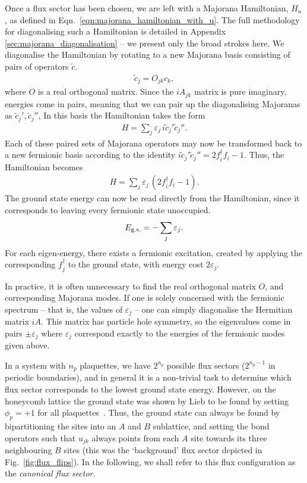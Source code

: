 Once a flux sector has been chosen, we are left with a Majorana Hamiltonian, $H_u$, as defined in Eqn.~\ref{eqn:majorana_hamiltonian_with_u}. The full methodology for diagonalising such a Hamiltonian is detailed in Appendix \ref{sec:majorana_diagonalisation} -- we present only the broad strokes here. We diagonalise the Hamiltonian by rotating to a new Majorana basis consisting of pairs of operators $\tilde c$. 
\begin{align}
    \tilde c_j = O_{jk}c_k,
\end{align}
where $O$ is a real orthogonal matrix. Since the $iA_{jk}$ matrix is pure imaginary, energies come in pairs, meaning that we can pair up the diagonalising Majoranas as $\tilde c_j', \tilde c_j''$,  In this basis the Hamiltonian takes the form 
\begin{align}
    H = \sum_{ j } \varepsilon_j\, i \tilde c_j' \tilde c_j''.
\end{align}
Each of these paired sets of Majorana operators may now be transformed back to a new fermionic basis according to the identity $ i \tilde c_j' \tilde c_j'' = 2 f_i^\dag f_i - 1$. Thus, the Hamiltonian becomes
\begin{align}
    H = \sum_{ j } \varepsilon_j\,(2 f_i^\dag f_i - 1).
\end{align}
The ground state energy can now be read directly from the Hamiltonian, since it corresponds to leaving every fermionic state unoccupied. 
\begin{align}
    E_\textup{g.s.} = -\sum_j \varepsilon_j.
\end{align}
For each eigen-energy, there exists a fermionic excitation, created by applying the corresponding $f^\dag_j$ to the ground state, with energy cost $2\varepsilon_j$. 

In practice, it is often unnecessary to find the real orthogonal matrix $O$, and corresponding Majorana modes. If one is solely concerned with the fermionic spectrum -- that is, the values of $\varepsilon_j$ -- one can simply diagonalise the Hermitian matrix $iA$. This matrix has particle hole symmetry, so the eigenvalues come in pairs $\pm \varepsilon_j$ where $\varepsilon_j$ correspond exactly to the energies of the fermionic modes given above.

In a system with $n_p$ plaquettes, we have $2^{n_p}$ possible flux sectors ($2^{n_p-1}$ in periodic boundaries), and in general it is a non-trivial task to determine which flux sector corresponds to the lowest ground state energy. However, on the honeycomb lattice the ground state was shown by Lieb to be found by setting $\phi_p=+1$ for all plaquettes~\cite{lieb_flux_1994}. Thus, the ground state can always be found by bipartitioning the sites into an $A$ and $B$ sublattice, and setting the bond operators such that $u_{jk}$ always points from each $A$ site towards its three neighbouring $B$ sites (this was the `background' flux sector depicted in Fig.~\ref{fig:flux_flips}). In the following, we shall refer to this flux configuration as the {\it canonical flux sector.}

